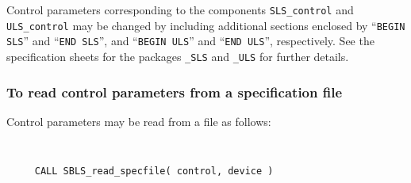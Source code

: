 \documentclass{galahad}
\begin{document}
Control parameters corresponding to the components
{\tt SLS\_control}
and
{\tt ULS\_control} may be changed by including additional sections enclosed by
``{\tt BEGIN SLS}'' and
``{\tt END SLS}'', and
``{\tt BEGIN ULS}'' and
``{\tt END ULS}'', respectively.
See the specification sheets for the packages
{\tt \libraryname\_SLS}
and
{\tt \libraryname\_ULS}
for further details.

\subsubsection{To read control parameters from a specification file}
\label{readspec}

Control parameters may be read from a file as follows:
\hskip0.5in

\def\baselinestretch{0.8}
{\tt
\begin{verbatim}
     CALL SBLS_read_specfile( control, device )
\end{verbatim}
}
\def\baselinestretch{1.0}
\end{document}
